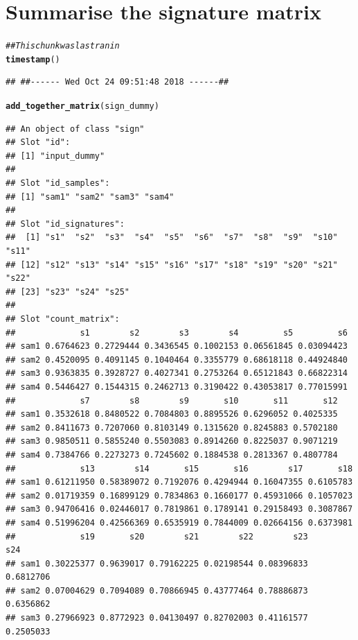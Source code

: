 \documentclass{article}\usepackage[]{graphicx}\usepackage[]{color}
\makeatletter
\newcommand{\hlcom}[1]{\textcolor[rgb]{0.678,0.584,0.686}{\textit{#1}}}%
\newcommand{\hlstd}[1]{\textcolor[rgb]{0.345,0.345,0.345}{#1}}%
\newcommand{\hlkwd}[1]{\textcolor[rgb]{0.737,0.353,0.396}{\textbf{#1}}}%
\newenvironment{kframe}{%
 \def\at@end@of@kframe{}%
 \ifinner\ifhmode%
  \def\at@end@of@kframe{\end{minipage}}%
  \begin{minipage}{\columnwidth}%
 \fi\fi%
 \def\FrameCommand##1{\hskip\@totalleftmargin \hskip-\fboxsep
 \colorbox{shadecolor}{##1}\hskip-\fboxsep
     \hskip-\linewidth \hskip-\@totalleftmargin \hskip\columnwidth}%
 \MakeFramed {\advance\hsize-\width
   \@totalleftmargin\z@ \linewidth\hsize
   \@setminipage}}%
 {\par\unskip\endMakeFramed%
 \at@end@of@kframe}
\newenvironment{knitrout}{}{} %
\makeatother
\begin{document}
\section{Summarise the signature matrix}
\begin{knitrout}
\color{fgcolor}\begin{kframe}
\begin{alltt}
\hlcom{## This chunk was last ran in}
\hlkwd{timestamp}\hlstd{()}
\end{alltt}
\begin{verbatim}
## ##------ Wed Oct 24 09:51:48 2018 ------##
\end{verbatim}
\begin{alltt}
\hlkwd{add_together_matrix}\hlstd{(sign_dummy)}
\end{alltt}
\begin{verbatim}
## An object of class "sign"
## Slot "id":
## [1] "input_dummy"
## 
## Slot "id_samples":
## [1] "sam1" "sam2" "sam3" "sam4"
## 
## Slot "id_signatures":
##  [1] "s1"  "s2"  "s3"  "s4"  "s5"  "s6"  "s7"  "s8"  "s9"  "s10" "s11"
## [12] "s12" "s13" "s14" "s15" "s16" "s17" "s18" "s19" "s20" "s21" "s22"
## [23] "s23" "s24" "s25"
## 
## Slot "count_matrix":
##             s1        s2        s3        s4         s5         s6
## sam1 0.6764623 0.2729444 0.3436545 0.1002153 0.06561845 0.03094423
## sam2 0.4520095 0.4091145 0.1040464 0.3355779 0.68618118 0.44924840
## sam3 0.9363835 0.3928727 0.4027341 0.2753264 0.65121843 0.66822314
## sam4 0.5446427 0.1544315 0.2462713 0.3190422 0.43053817 0.77015991
##             s7        s8        s9       s10       s11       s12
## sam1 0.3532618 0.8480522 0.7084803 0.8895526 0.6296052 0.4025335
## sam2 0.8411673 0.7207060 0.8103149 0.1315620 0.8245883 0.5702180
## sam3 0.9850511 0.5855240 0.5503083 0.8914260 0.8225037 0.9071219
## sam4 0.7384766 0.2273273 0.7245602 0.1884538 0.2813367 0.4807784
##             s13        s14       s15       s16        s17       s18
## sam1 0.61211950 0.58389072 0.7192076 0.4294944 0.16047355 0.6105783
## sam2 0.01719359 0.16899129 0.7834863 0.1660177 0.45931066 0.1057023
## sam3 0.94706416 0.02446017 0.7819861 0.1789141 0.29158493 0.3087867
## sam4 0.51996204 0.42566369 0.6535919 0.7844009 0.02664156 0.6373981
##             s19       s20        s21        s22        s23       s24
## sam1 0.30225377 0.9639017 0.79162225 0.02198544 0.08396833 0.6812706
## sam2 0.07004629 0.7094089 0.70866945 0.43777464 0.78886873 0.6356862
## sam3 0.27966923 0.8772923 0.04130497 0.82702003 0.41161577 0.2505033

\end{verbatim}
\end{kframe}
\end{knitrout}
\end{document}
